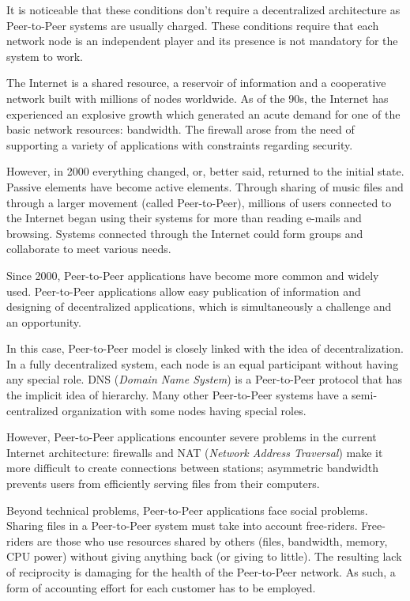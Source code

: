 It is noticeable that these conditions don't require a decentralized
architecture as Peer-to-Peer systems are usually charged. These conditions
require that each network node is an independent player and its presence
is not mandatory for the system to work.

The Internet is a shared resource, a reservoir of information and a
cooperative network built with millions of nodes worldwide. As of the 90s, the
Internet has experienced an explosive growth which generated an acute demand
for one of the basic network resources: bandwidth. The firewall arose from the
need of supporting a variety of applications with constraints regarding
security.

However, in 2000 everything changed, or, better said, returned to the initial
state. Passive elements have become active elements. Through sharing of music
files and through a larger movement (called Peer-to-Peer),
millions of users connected to the Internet began using their systems
for more than reading e-mails and browsing. Systems connected through the
Internet could form groups and collaborate to meet various needs.

Since 2000, Peer-to-Peer applications have become more common and
widely used. Peer-to-Peer applications allow easy publication of information
and designing of decentralized applications, which is simultaneously a
challenge and an opportunity.

In this case, Peer-to-Peer model is closely linked with the idea of
decentralization. In a fully decentralized system, each node is an equal
participant without having any special role. DNS (\textit{Domain Name System})
is a Peer-to-Peer protocol that has the implicit idea of hierarchy. Many other
Peer-to-Peer systems have a semi-centralized organization with some nodes
having special roles.

However, Peer-to-Peer applications encounter severe problems in the current
Internet architecture: firewalls and NAT (\textit{Network Address Traversal})
make it more difficult to create connections between stations; asymmetric
bandwidth prevents users from efficiently serving files from their computers.

Beyond technical problems, Peer-to-Peer applications face social problems.
Sharing files in a Peer-to-Peer system must take into account free-riders.
Free-riders are those who use resources shared by others (files, bandwidth,
memory, CPU power) without giving anything back (or giving to little). The
resulting lack of reciprocity is damaging for the health of the Peer-to-Peer
network. As such, a form of accounting effort for each customer has to be
employed.

